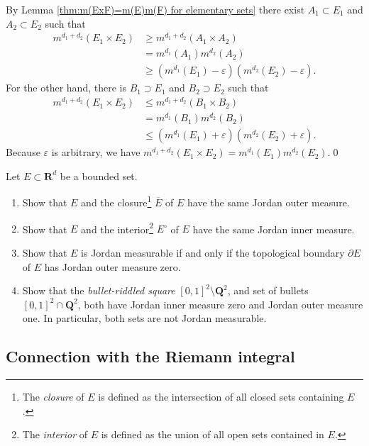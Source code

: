 \documentclass{book}
\theoremstyle{defstyle}
\theoremstyle{thmstyle}
\begin{document}
By Lemma \ref{thm:m(ExF)=m(E)m(F) for elementary sets} there exist $A_1 \subset E_1$ and $A_2 \subset E_2$ such that
    \begin{align*}
        m^{d_1 + d_2}(E_1 \times E_2)
        &\geq m^{d_1 + d_2}(A_1 \times A_2)\\
        &= m^{d_1}(A_1)m^{d_2}(A_2)\\
        &\geq (m^{d_1}(E_1) - \varepsilon)(m^{d_2}(E_2) - \varepsilon).
    \end{align*}
For the other hand, there is $B_1 \supset E_1$ and $B_2 \supset E_2$ such that
    \begin{align*}
        m^{d_1 + d_2}(E_1 \times E_2)
        &\leq m^{d_1 + d_2}(B_1 \times B_2)\\
        &= m^{d_1}(B_1)m^{d_2}(B_2)\\
        &\leq (m^{d_1}(E_1) + \varepsilon)(m^{d_2}(E_2) + \varepsilon).
    \end{align*}
Because $\varepsilon$ is arbitrary, we have $m^{d_1 + d_2}(E_1 \times E_2) = m^{d_1}(E_1)m^{d_2}(E_2)$.\qed


\begin{example}
    Let $E \subset \mathbf{R}^d$ be a bounded set.
    \begin{enumerate}[label = (\arabic*)]
        \item Show that $E$ and the closure\footnote{The \emph{closure} of $E$ is defined as the intersection of all closed sets containing $E$.} $\overline{E}$ of $E$ have the same Jordan outer measure.
        \item Show that $E$ and the interior\footnote{The \emph{interior} of $E$ is defined as the union of all open sets contained in $E$. } $E^\circ$ of $E$ have the same Jordan inner measure.
        \item Show that $E$ is Jordan measurable if and only if the topological boundary $\partial E$ of $E$ has Jordan outer measure zero.
        \item Show that the \emph{bullet-riddled square} $[0, 1]^2 \setminus \mathbf{Q}^2$, and set of bullets $[0, 1]^2 \cap \mathbf{Q}^2$, both have Jordan inner measure zero and Jordan outer measure one. In particular, both sets are not Jordan measurable.
    \end{enumerate}
\end{example}


\subsection{Connection with the Riemann integral}
\end{document}
